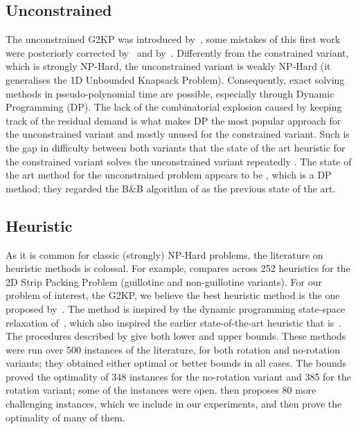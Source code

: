 \documentclass[ppgc,prop-tese,english,formais,babel]{iiufrgs}
\begin{document}
\subsection{Unconstrained}

The unconstrained G2KP was introduced by~\citet{gg:1965}, some mistakes of this first work were posteriorly corrected by~\citet{herz:1972} and by~\citet{beasley:1985:guillotine}.
Differently from the constrained variant, which is strongly NP-Hard, the unconstrained variant is weakly NP-Hard (it generalises the 1D Unbounded Knapsack Problem).
Consequently, exact solving methods in pseudo-polynomial time are possible, especially through Dynamic Programming (DP).
The lack of the combinatorial explosion caused by keeping track of the residual demand is what makes DP the most popular approach for the unconstrained variant and mostly unused for the constrained variant.
Such is the gap in difficulty between both variants that the state of the art heuristic for the constrained variant solves the unconstrained variant repeatedly \citep{velasco:2019}.
The state of the art method for the unconstrained problem appears to be \citet{russo:2014}, which is a DP method; they regarded the B\&B algorithm of \citet{kang:2011} as the previous state of the art.

\subsection{Heuristic}

As it is common for classic (strongly) NP-Hard problems, the literature on heuristic methods is colossal.
For example, \citet{ortmann:2010} compares across 252 heuristics for the 2D Strip Packing Problem (guillotine and non-guillotine variants).
For our problem of interest, the G2KP, we believe the best heuristic method is the one proposed by~\citet{velasco:2019}.
The method is inspired by the dynamic programming state-space relaxation of~\citet{nicos:1995:ssr}, which also inspired the earlier state-of-the-art heuristic that is~\citet{morabito:2010}.
The procedures described by \citet{velasco:2019} give both lower and upper bounds.
These methods were run over 500 instances of the literature, for both rotation and no-rotation variants; they obtained either optimal or better bounds in all cases.
The bounds proved the optimality of 348 instances for the no-rotation variant and 385 for the rotation variant; some of the instances were open.
\citet{velasco:2019} then proposes 80 more challenging instances, which we include in our experiments, and then prove the optimality of many of them.
\end{document}
